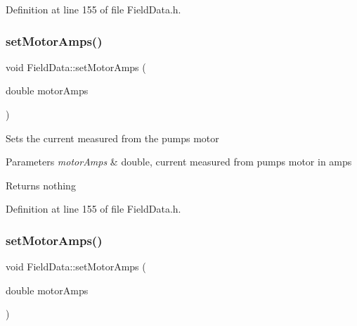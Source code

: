 Definition at line 155 of file Field\+Data.\+h.

\mbox{\label{class_field_data_a4f9373e8a215853b08bbe6a1915fb1a9}} 
\subsubsection{\texorpdfstring{set\+Motor\+Amps()}{setMotorAmps()}\hspace{0.1cm}{\footnotesize\ttfamily [2/3]}}
{\footnotesize\ttfamily void Field\+Data\+::set\+Motor\+Amps (\begin{DoxyParamCaption}\item[{double}]{motor\+Amps }\end{DoxyParamCaption})\hspace{0.3cm}{\ttfamily [inline]}}

Sets the current measured from the pump\textquotesingle{}s motor


\begin{DoxyParams}{Parameters}
{\em motor\+Amps} & double, current measured from pump\textquotesingle{}s motor in amps\\
\hline
\end{DoxyParams}
\begin{DoxyReturn}{Returns}
nothing 
\end{DoxyReturn}


Definition at line 155 of file Field\+Data.\+h.

\mbox{\label{class_field_data_a4f9373e8a215853b08bbe6a1915fb1a9}} 
\subsubsection{\texorpdfstring{set\+Motor\+Amps()}{setMotorAmps()}\hspace{0.1cm}{\footnotesize\ttfamily [3/3]}}
{\footnotesize\ttfamily void Field\+Data\+::set\+Motor\+Amps (\begin{DoxyParamCaption}\item[{double}]{motor\+Amps }\end{DoxyParamCaption})\hspace{0.3cm}{\ttfamily [inline]}}

